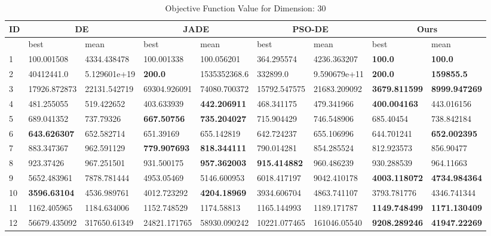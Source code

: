 \begin{table*}[t]
\centering
\caption{Objective Function Value for Dimension: 30}
 \begin{tabular}{|p{0.8cm}|p{1.6cm}|p{1.6cm}|p{1.6cm}|p{1.6cm}|p{1.6cm}|p{1.6cm}|p{1.6cm}|p{1.6cm}|} 
 \hline
 ID & \multicolumn{2}{c|}{DE} & \multicolumn{2}{c|}{JADE} & \multicolumn{2}{c|}{PSO-DE} & \multicolumn{2}{c|}{Ours} \\
 \hline
    & best & mean & best & mean & best & mean & best & mean \\ [0.5ex] 
 \hline
1  & 100.001508 & 4334.438478 & 100.001338 & 100.056201 & 364.295574 & 4236.363207 & \textbf{100.0} & \textbf{100.0} \\ 
2  & 40412441.0 & 5.129601e+19 & \textbf{200.0} & 1535352368.6 & 332899.0 & 9.590679e+11 & \textbf{200.0} & \textbf{159855.5} \\ 
3  & 17926.872873 & 22131.542719 & 69304.926091 & 74080.700372 & 15792.547575 & 21683.209092 & \textbf{3679.811599} & \textbf{8999.947269} \\ 
4  & 481.255055 & 519.422652 & 403.633939 & \textbf{442.206911} & 468.341175 & 479.341966 & \textbf{400.004163} & 443.016156 \\ 
5  & 689.041352 & 737.79326 & \textbf{667.50756} & \textbf{735.204027} & 715.904429 & 746.548906 & 685.40454 & 738.842184 \\ 
6  & \textbf{643.626307} & 652.582714 & 651.39169 & 655.142819 & 642.724237 & 655.106996 & 644.701241 & \textbf{652.002395} \\ 
7  & 883.347367 & 962.591129 & \textbf{779.907693} & \textbf{818.344111} & 790.014281 & 854.285524 & 812.923573 & 856.90477 \\ 
8  & 923.37426 & 967.251501 & 931.500175 & \textbf{957.362003} & \textbf{915.414882} & 960.486239 & 930.288539 & 964.11663 \\ 
9  & 5652.483961 & 7878.781444 & 4953.05469 & 5146.600953 & 6018.417197 & 9042.410178 & \textbf{4003.118072} & \textbf{4734.984364} \\ 
10  & \textbf{3596.63104} & 4536.989761 & 4012.723292 & \textbf{4204.18969} & 3934.606704 & 4863.741107 & 3793.781776 & 4346.741344 \\ 
11  & 1162.405965 & 1184.634006 & 1152.748529 & 1174.58813 & 1165.144993 & 1189.171787 & \textbf{1149.748499} & \textbf{1171.130409} \\ 
12  & 56679.435092 & 317650.61349 & 24821.171765 & 58930.090242 & 10221.077465 & 161046.05540 & \textbf{9208.289246} & \textbf{41947.22269} \\ 

\end{tabular}
\end{table*}
